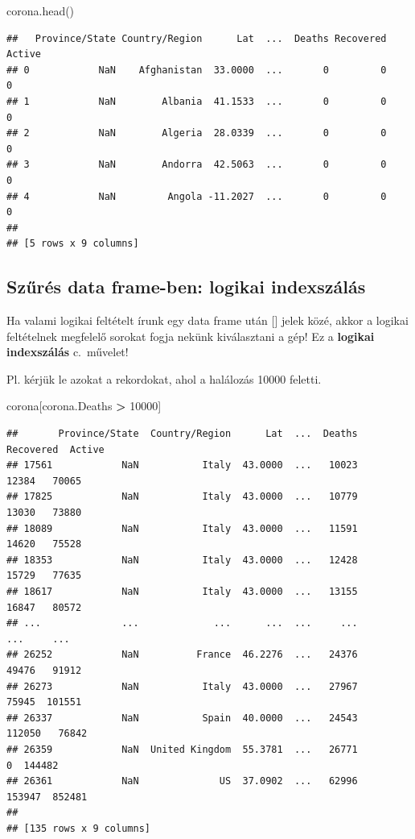 \documentclass[
]{book}
\newenvironment{Shaded}{\begin{snugshade}}{\end{snugshade}}
\newcommand{\DecValTok}[1]{\textcolor[rgb]{0.00,0.00,0.81}{#1}}
\newcommand{\NormalTok}[1]{#1}
\newcommand{\OperatorTok}[1]{\textcolor[rgb]{0.81,0.36,0.00}{\textbf{#1}}}
\begin{document}
\begin{Shaded}
\begin{Highlighting}[]
\NormalTok{corona.head()}
\end{Highlighting}
\end{Shaded}

\begin{verbatim}
##   Province/State Country/Region      Lat  ...  Deaths Recovered  Active
## 0            NaN    Afghanistan  33.0000  ...       0         0       0
## 1            NaN        Albania  41.1533  ...       0         0       0
## 2            NaN        Algeria  28.0339  ...       0         0       0
## 3            NaN        Andorra  42.5063  ...       0         0       0
## 4            NaN         Angola -11.2027  ...       0         0       0
## 
## [5 rows x 9 columns]
\end{verbatim}

\subsection{Szűrés data frame-ben: logikai indexszálás}\label{szux171ruxe9s-data-frame-ben-logikai-indexszuxe1luxe1s}

Ha valami logikai feltételt írunk egy data frame után {[}{]} jelek közé, akkor a logikai feltételnek megfelelő sorokat fogja nekünk kiválasztani a gép! Ez a \textbf{logikai indexszálás} c.~művelet!

Pl. kérjük le azokat a rekordokat, ahol a halálozás 10000 feletti.

\begin{Shaded}
\begin{Highlighting}[]
\NormalTok{corona[corona.Deaths }\OperatorTok{\textgreater{}} \DecValTok{10000}\NormalTok{]}
\end{Highlighting}
\end{Shaded}

\begin{verbatim}
##       Province/State  Country/Region      Lat  ...  Deaths Recovered  Active
## 17561            NaN           Italy  43.0000  ...   10023     12384   70065
## 17825            NaN           Italy  43.0000  ...   10779     13030   73880
## 18089            NaN           Italy  43.0000  ...   11591     14620   75528
## 18353            NaN           Italy  43.0000  ...   12428     15729   77635
## 18617            NaN           Italy  43.0000  ...   13155     16847   80572
## ...              ...             ...      ...  ...     ...       ...     ...
## 26252            NaN          France  46.2276  ...   24376     49476   91912
## 26273            NaN           Italy  43.0000  ...   27967     75945  101551
## 26337            NaN           Spain  40.0000  ...   24543    112050   76842
## 26359            NaN  United Kingdom  55.3781  ...   26771         0  144482
## 26361            NaN              US  37.0902  ...   62996    153947  852481
## 
## [135 rows x 9 columns]
\end{verbatim}
\end{document}
